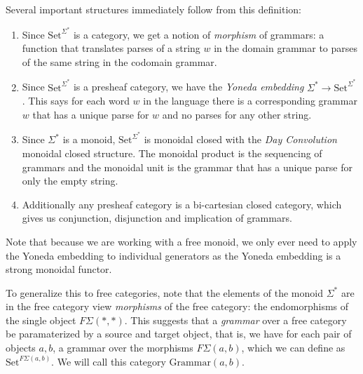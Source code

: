 \documentclass[12pt]{article}
\newcommand{\Set}{\textrm{Set}}
\newcommand{\Grammar}{\textrm{Grammar}}
\begin{document}
Several important structures immediately follow from this definition:
\begin{enumerate}
\item Since $\Set^{\Sigma^*}$ is a category, we get a notion of
  \emph{morphism} of grammars: a function that translates parses of a
  string $w$ in the domain grammar to parses of the same string in the
  codomain grammar.
\item Since $\Set^{\Sigma^*}$ is a presheaf category, we have the
  \emph{Yoneda embedding} $\Sigma^* \to \Set^{\Sigma^*}$. This says
  for each word $w$ in the language there is a corresponding grammar
  $w$ that has a unique parse for $w$ and no parses for any other
  string.
\item Since $\Sigma^*$ is a monoid, $\Set^{\Sigma^*}$ is monoidal
  closed with the \emph{Day Convolution} monoidal closed
  structure. The monoidal product is the sequencing of grammars and
  the monoidal unit is the grammar that has a unique parse for only
  the empty string.
\item Additionally any presheaf category is a bi-cartesian closed
  category, which gives us conjunction, disjunction and implication of
  grammars.
\end{enumerate}
Note that because we are working with a free monoid, we only ever need
to apply the Yoneda embedding to individual generators as the Yoneda
embedding is a strong monoidal functor.

To generalize this to free categories, note that the elements of the
monoid $\Sigma^*$ are in the free category view \emph{morphisms} of
the free category: the endomorphisms of the single object
$F\Sigma(*,*)$. This suggests that a \emph{grammar} over a free
category be paramaterized by a source and target object, that is, we
have for each pair of objects $a,b$, a grammar over the morphisms
$F\Sigma(a,b)$, which we can define as $\Set^{F\Sigma(a,b)}$. We will
call this category $\Grammar(a,b)$.
\end{document}
